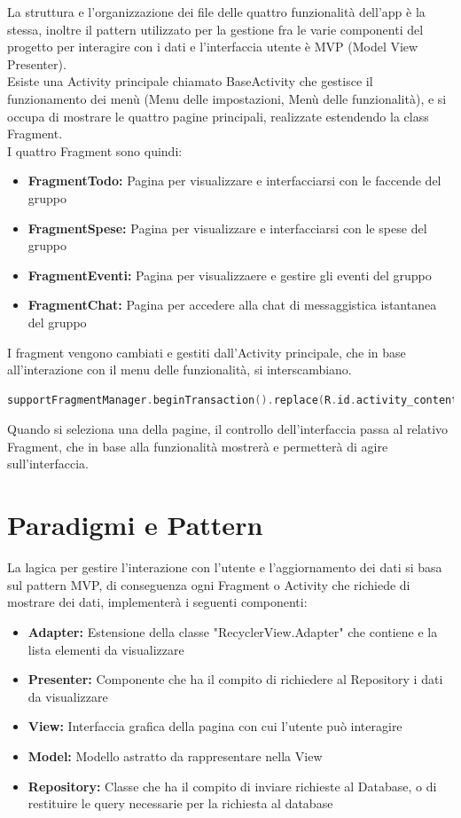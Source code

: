 La struttura e l'organizzazione dei file delle quattro funzionalità dell'app è la stessa, inoltre il pattern utilizzato per la gestione fra le varie componenti del progetto per interagire con i dati e l'interfaccia utente è MVP (Model View Presenter).\\
Esiste una Activity principale chiamato BaseActivity che gestisce il funzionamento dei menù (Menu delle impostazioni, Menù delle funzionalità), e si occupa di mostrare le quattro pagine principali, realizzate estendendo la class Fragment.\\
I quattro Fragment sono quindi:
\begin{itemize}
    \item \textbf{FragmentTodo:} Pagina per visualizzare e interfacciarsi con le faccende del gruppo
    \item \textbf{FragmentSpese:} Pagina per visualizzare e interfacciarsi con le spese del gruppo
    \item \textbf{FragmentEventi:} Pagina per visualizzaere e gestire gli eventi del gruppo
    \item \textbf{FragmentChat:} Pagina per accedere alla chat di messaggistica istantanea del gruppo
\end{itemize}
I fragment vengono cambiati e gestiti dall'Activity principale, che in base all'interazione con il menu delle funzionalità, si interscambiano.
\begin{lstlisting}[language=kotlin,caption={Aggiornamento fragment del BaseActivity}]
 supportFragmentManager.beginTransaction().replace(R.id.activity_content, TodoFragment()).commit()
\end{lstlisting}

Quando si seleziona una della pagine, il controllo dell'interfaccia passa al relativo Fragment, che in base alla funzionalità mostrerà e permetterà di agire sull'interfaccia.\\

\section{Paradigmi e Pattern}
La lagica per gestire l'interazione con l'utente e l'aggiornamento dei dati si basa sul pattern MVP, di conseguenza ogni Fragment o Activity che richiede di mostrare dei dati, implementerà i seguenti componenti:
\begin{itemize}
    \item \textbf{Adapter:} Estensione della classe "RecyclerView.Adapter" che contiene e la lista elementi da visualizzare
    \item  \textbf{Presenter:} Componente che ha il compito di richiedere al Repository i dati da visualizzare
    \item  \textbf{View:} Interfaccia grafica della pagina con cui l'utente può interagire
    \item  \textbf{Model:} Modello astratto da rappresentare nella View
    \item  \textbf{Repository:} Classe che ha il compito di inviare richieste al Database, o di restituire le query necessarie per la richiesta al database
\end{itemize}
\newpage

